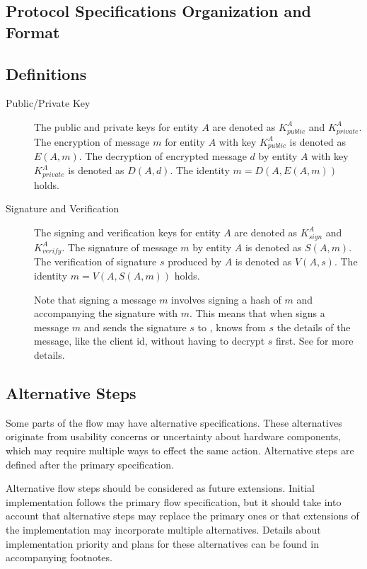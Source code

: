 \documentclass[a4paper,10pt]{article}
\begin{document}
\subsection{Protocol Specifications Organization and Format}

\subsection{Definitions}\label{sec:definitions}

\begin{description}
 \item[Public/Private Key] The public and private keys for entity $A$ are denoted as $K_{public}^A$ and $K_{private}^A$. The encryption of message $m$ for entity $A$ with key 
$K_{public}^A$ is denoted as $E(A,m)$. The decryption of encrypted message $d$ by entity $A$ with key $K_{private}^A$ is denoted as $D(A,d)$. The identity $m=D(A,E(A,m))$ holds.
 \item[Signature and Verification] The signing and verification keys for entity $A$ are denoted as $K_{sign}^A$ and $K_{verify}^A$. The signature of message $m$ by entity $A$ is 
denoted as $S(A,m)$. The verification of signature $s$ produced by $A$ is denoted as $V(A,s)$. The identity $m=V(A,S(A,m))$ holds.

Note that signing a message $m$ involves signing a hash of $m$ and accompanying the signature with $m$. This means that when \Client{} signs a message $m$ and sends the signature 
$s$ to \Server{}, \Server{} knows from $s$ the details of the message, like the client id, without having to decrypt $s$ first. See \cite{crypto_spec} for more details.
\end{description}

\subsection{Alternative Steps}
Some parts of the flow may have alternative specifications. These alternatives originate from usability concerns or uncertainty about hardware components, which may require 
multiple ways to effect the same action. Alternative steps are defined after the primary specification.

Alternative flow steps should be considered as future extensions. Initial implementation follows the primary flow specification, but it should take into account that alternative 
steps may replace the primary ones or that extensions of the implementation may incorporate multiple alternatives. Details about implementation priority and plans for these 
alternatives can be found in accompanying footnotes.
\end{document}
